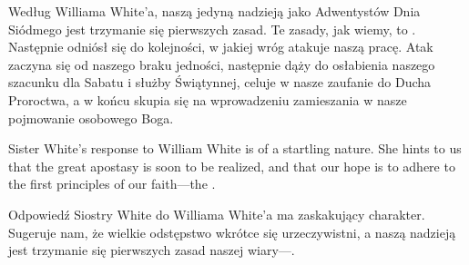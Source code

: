 Według Williama White'a, naszą jedyną nadzieją jako Adwentystów Dnia Siódmego jest trzymanie się pierwszych zasad. Te zasady, jak wiemy, to . Następnie odniósł się do kolejności, w jakiej wróg atakuje naszą pracę. Atak zaczyna się od naszego braku jedności, następnie dąży do osłabienia naszego szacunku dla Sabatu i służby Świątynnej, celuje w nasze zaufanie do Ducha Proroctwa, a w końcu skupia się na wprowadzeniu zamieszania w nasze pojmowanie osobowego Boga.


Sister White’s response to William White is of a startling nature. She hints to us that the great apostasy is soon to be realized, and that our hope is to adhere to the first principles of our faith—the .


Odpowiedź Siostry White do Williama White'a ma zaskakujący charakter. Sugeruje nam, że wielkie odstępstwo wkrótce się urzeczywistni, a naszą nadzieją jest trzymanie się pierwszych zasad naszej wiary—.


 \\
 \\
 \\


 \\
 \\
 \\






